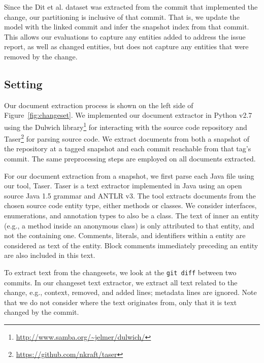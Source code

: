 Since the Dit et al. dataset was extracted from the commit that implemented the
change, our partitioning is inclusive of that commit.  That is, we update the
model with the linked commit and infer the snapshot index from that commit.
This allows our evaluations to capture any entities added to address the issue
report, as well as changed entities, but does not capture any entities that were
removed by the change.




\subsection{Setting}

Our document extraction process is shown on the left side of Figure~\ref{fig:changeset}.
We implemented our document extractor in Python v2.7
using the Dulwich library\footnote{\url{http://www.samba.org/~jelmer/dulwich/}}
for interacting with the source code repository and
Taser\footnote{\url{https://github.com/nkraft/taser}} for parsing source code.
We extract documents from both a snapshot of the repository at a tagged
snapshot and each commit reachable from that tag's commit.
The same preprocessing steps are employed on all documents extracted.

For our document extraction from a snapshot, we first parse each Java file using our tool, Taser.
Taser is a text extractor implemented in Java using an open source Java 1.5 grammar and ANTLR v3.
The tool extracts documents from the chosen source code entity type, either methods or classes.
We consider interfaces, enumerations, and annotation types to also be a class.
The text of inner an entity (e.g., a method inside an anonymous class)
is only attributed to that entity, and not the containing one.
Comments, literals, and identifiers within a entity are considered as text of the entity.
Block comments immediately preceding an entity are also included in this text.

To extract text from the changesets, we look at
the \texttt{git diff} between two commits.
In our changeset text extractor, we extract all text related to the
change, e.g., context, removed, and added lines; metadata lines are ignored.
Note that we do not consider where the text originates from,
only that it is text changed by the commit.%

